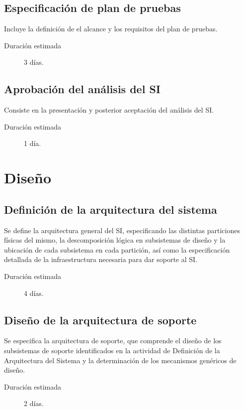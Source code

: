 \documentclass[11pt,a4paper,spanish,twoside]{report}
\begin{document}
\subsection{Especificación de plan de pruebas}
Incluye la definición de el alcance y los requisitos del plan de pruebas.
\begin{description}
\item[Duración estimada] 3 días.
\end{description}

\subsection{Aprobación del análisis del SI}
Consiste en la presentación y posterior aceptación del
    análisis del SI.
\begin{description}
\item[Duración estimada] 1 día.
\end{description}

\section{Diseño}
\subsection{Definición de la arquitectura del sistema}
Se define la arquitectura general del SI, especificando las distintas
particiones físicas del mismo, la descomposición lógica en subsistemas de
diseño y la ubicación de cada subsistema en cada partición, así como la
especificación detallada de la infraestructura necesaria para dar soporte al
SI. 
\begin{description}
\item[Duración estimada] 4 días.
\end{description}

\subsection{Diseño de la arquitectura de soporte}
Se especifica la arquitectura de soporte, que comprende el diseño de los
subsistemas de soporte identificados en la actividad de Definición de la
Arquitectura del Sistema y la determinación de los mecanismos genéricos de
diseño.
\begin{description}
\item[Duración estimada] 2 días.
\end{description}
\end{document}
